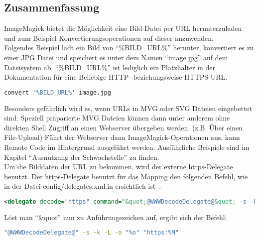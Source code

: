 \subsection{Zusammenfassung}\label{subsec:zusammenfassung}

ImageMagick bietet die Möglichkeit eine Bild-Datei per URL herunterzuladen und zum Beispiel Konvertierungsoperationen auf
dieser anzuwenden.\\

Folgendes Beispiel lädt ein Bild von "`\%BILD\_URL\%"' herunter,
konvertiert es zu einer JPG Datei und speichert es unter dem Namen "`image.jpg"' auf dem Dateisystem ab.
"`\%BILD\_URL\%"' ist lediglich ein Platzhalter in der Dokumentation für eine Beliebige HTTP- beziehungsweise HTTPS-URL.

\begin{lstlisting}[language=Bash, caption=Beispielbefehl Codeablauf,label={lst:codeablaufbeispiel}]
convert '%BILD_URL%' image.jpg
\end{lstlisting}
\vspace{5mm}

Besonders gefährlich wird es, wenn URLs in MVG oder SVG Dateien eingebettet sind.
Speziell präparierte MVG Dateien können dann unter anderem ohne direkten Shell Zugriff an einen Webserver übergeben werden.
(z.B. Über einen File-Upload)
Führt der Webserver dann ImageMagick-Operationen aus, kann Remote Code im Hintergrund ausgeführt werden.
Ausführliche Beispiele sind im Kapitel "`Ausnutzung der Schwachstelle"' zu finden.\\

Um die Bilddaten der URL zu bekommen, wird der externe https-Delegate benutzt.
Der https-Delegate benutzt für das Mapping den folgenden Befehl,
wie in der Datei config/delegates.xml.in ersichtlich ist~\cite{DelegatesXml}.

\begin{lstlisting}[firstnumber=90, language=XML, caption=config/delegates.xml.in https-Delegate,label={lst:lstlisting}]
  <delegate decode="https" command="&quot;@WWWDecodeDelegate@&quot; -s -k -L -o &quot;%o&quot; &quot;https:%M&quot;"/>
\end{lstlisting}
\vspace{5mm}

Löst man "`\&quot"' nun zu Anführungszeichen auf, ergibt sich der Befehl:\\
\begin{lstlisting}[firstnumber=1, language=Bash, caption=Aufgelöster https-Delegate-Befehl,label={lst:lstlisting}]
"@WWWDecodeDelegate@" -s -k -L -o "%o" "https:%M"
\end{lstlisting}
\vspace{5mm}

